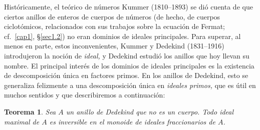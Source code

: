 \documentclass[10pt,oneside,bibtotoc,smallheadings,leqno,a5paper,DIV=12]{scrbook}
\numberwithin{equation}{section}
\theoremstyle{defi}
\theoremstyle{enonce}
\newtheorem{theorem}{Teorema}
\theoremstyle{rem}
\numberwithin{theorem}{section}
\numberwithin{proposition}{section}
\numberwithin{definition}{section}
\numberwithin{lemma}{section}
\numberwithin{corollary}{section}
\numberwithin{example}{section}
\numberwithin{footnote}{section}%
\begin{document}
Hist\'oricamente, el te\'orico de n\'umeros Kummer (1810--1893) se di\'o cuenta de que
ciertos anillos de enteros de cuerpos de n\'umeros (de hecho, de cuerpos ciclot\'omicos, relacionados
con sus trabajos sobre la ecuaci\'on de Fermat; cf.~\ref{cap1}, \S\ref{sec1.2}) no eran dominios de ideales principales. Para
superar, al menos en parte, estos inconvenientes, Kummer y Dedekind (1831--1916) introdujeron la noci\'on
de {\em ideal,} y Dedekind estudi\'o los anillos que hoy llevan su nombre. El principal inter\'es de los dominios
de ideales principales es la existencia de descomposici\'on \'unica en factores primos. En los anillos de
Dedekind, esto se generaliza felizmente a una descomposici\'on \'unica en {\em ideales primos,} que es \'util
en muchos sentidos y que describiremos a continuaci\'on:

\begin{theorem}\label{teo3.4.2}
Sea $A$ un anillo de Dedekind que no es un cuerpo. Todo ideal maximal de $A$ es inversible en el monoide de
ideales fraccionarios de $A$.
\end{theorem}
\end{document}
